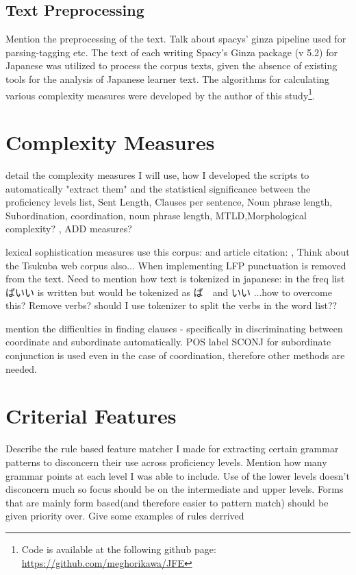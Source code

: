 \subsection{Text Preprocessing}
Mention the preprocessing of the text. Talk about spacys' ginza pipeline used for parsing-tagging etc.
The text of each writing
Spacy's Ginza package \cite{Ginza} (v 5.2) for Japanese was utilized to process the corpus texts, given the
absence of existing tools for the analysis of Japanese learner text. The algorithms for calculating various complexity measures were developed by the author of this study\footnote{Code is available at the following github page:  \href{https://github.com/meghorikawa/JFE}{https://github.com/meghorikawa/JFE} }.

\section{Complexity Measures}
detail the complexity measures I will use, how I developed the scripts to automatically "extract them" and the statistical significance between the proficiency levels
list, Sent Length, Clauses per sentence, Noun phrase length,  Subordination, coordination, noun phrase length, MTLD,Morphological complexity? , ADD measures?

lexical sophistication measures use this corpus: \cite{BCCWJ_List} and article citation: \cite{maekawa2014}, Think
about the Tsukuba web corpus also...
When implementing LFP punctuation is removed from the text. Need to mention how text is tokenized in japanese: in
the freq list ばいい is written but would be tokenized as ば　and いい ...how to overcome this? Remove verbs? should I use
tokenizer to split the verbs in the word list??

mention the difficulties in finding clauses - specifically in discriminating between coordinate and subordinate
automatically.  POS label SCONJ for subordinate conjunction is used even in the case of coordination, therefore
other methods are needed.

\section{Criterial Features}
Describe the rule based feature matcher I made for extracting certain grammar patterns to disconcern their use
across proficiency levels. Mention how many grammar points at each level I was able to include. Use of the lower
levels doesn't disconcern much so focus should be on the intermediate and upper levels.  Forms that are mainly form
based(and therefore easier to pattern match) should be given priority over. Give some examples of rules derrived

